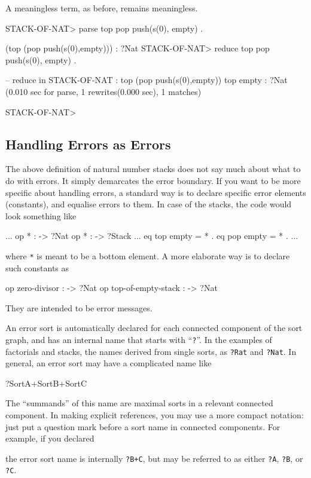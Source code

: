 \documentclass[a4paper]{memoir}
\begin{document}
A meaningless term, as before, remains meaningless.
\begin{vvtm}
\begin{ccode}
  STACK-OF-NAT> parse top pop push(s(0), empty) .

  (top (pop push(s(0),empty))) : ?Nat
  STACK-OF-NAT> reduce top pop push(s(0), empty) .

  -- reduce in STACK-OF-NAT : top (pop push(s(0),empty))
  top empty : ?Nat
  (0.010 sec for parse, 1 rewrites(0.000 sec), 1 matches)

STACK-OF-NAT> 
\end{ccode}
\end{vvtm}

\subsection{Handling Errors as Errors}

The above definition of natural number stacks does not say much about
what to do with errors. It simply demarcates the error boundary.
If you want to be more specific about handling errors,
a standard way is to declare specific error elements
(constants), and equalise errors to them. In case of
the stacks, the code would look something like
\begin{vvtm}
\begin{ccode}
  ...
  op * : -> ?Nat
  op * : -> ?Stack
  ...
  eq top empty = * .
  eq pop empty = * .
  ...
\end{ccode}
\end{vvtm}
where \verb|*| is meant to be a bottom element. A more elaborate
way is to declare such constants as
\begin{vvtm}
\begin{ccode}
  op zero-divisor : -> ?Nat
  op top-of-empty-stack : -> ?Nat
\end{ccode}
\end{vvtm}
They are intended to be error messages.

An error sort is automatically declared for each connected component of
the sort graph, and has an internal name that starts with ``\verb|?|''.
In the examples of factorials and stacks, the names derived from single
sorts, as \verb|?Rat| and \verb|?Nat|. In general, an error sort may
have a complicated name like
\begin{vvtm}
\begin{ccode}
  ?SortA+SortB+SortC
\end{ccode}
\end{vvtm}
The ``summands'' of this name are maximal sorts in a relevant connected
component. In making explicit references, you may use a more compact
notation: just put a question mark before a sort name in connected
components. For example,
if you declared
\begin{vvtm}
\begin{ccode}
  [ A < B, A < C ]
\end{ccode}
\end{vvtm}
the error sort name is internally \verb|?B+C|, but may be referred to
as either \verb|?A|, \verb|?B|, or \verb|?C|.
\end{document}
